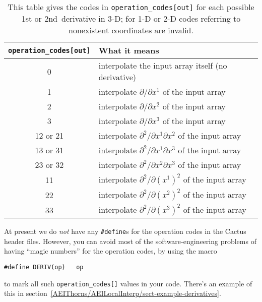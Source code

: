 \begin{table}
\begin{center}
\begin{tabular}{cl}
\verb|operation_codes[out]|
	& What it means							\\
\hline %
0	& interpolate the input array itself (no derivative)		\\[1ex]
1	& interpolate $\partial \big/ \partial x^1$ of the input array	\\
2	& interpolate $\partial \big/ \partial x^2$ of the input array	\\
3	& interpolate $\partial \big/ \partial x^3$ of the input array	\\[1ex]
12 or 21& interpolate $\partial^2 \big/ \partial x^1 \partial x^2$
	  of the input array						\\
13 or 31& interpolate $\partial^2 \big/ \partial x^1 \partial x^3$
	  of the input array						\\
23 or 32& interpolate $\partial^2 \big/ \partial x^2 \partial x^3$
	  of the input array						\\
11	& interpolate $\partial^2 \big/ \partial (x^1)^2$ of the input array \\
22	& interpolate $\partial^2 \big/ \partial (x^2)^2$ of the input array \\
33	& interpolate $\partial^2 \big/ \partial (x^3)^2$ of the input array \\
\hline %
\end{tabular}
\end{center}
\caption[Derivative Codes]
	{
	This table gives the codes in {\tt operation\_codes[out]}
	for each possible 1st or 2nd~derivative in 3-D; for 1-D or
	2-D codes referring to nonexistent coordinates are invalid.
	}
\label{AEIThorns/AEILocalInterp/tab-derivative-codes}
\end{table}


At present we do {\em not\/} have any \verb|#define|s for the
operation codes in the Cactus header files.  However, you can avoid
most of the software-engineering problems of having ``magic numbers''
for the operation codes, by using the macro
\begin{verbatim}
#define DERIV(op)   op
\end{verbatim}
to mark all such \verb|operation_codes[]| values in your code.
There's an example of this in
section~\ref{AEIThorns/AEILocalInterp/sect-example-derivatives}.

